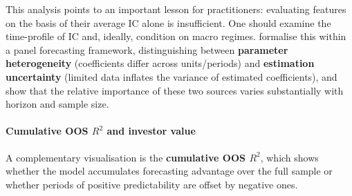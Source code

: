This analysis points to an important lesson for practitioners: evaluating features on the basis of their average IC alone is insufficient. One should examine the time-profile of IC and, ideally, condition on macro regimes. \cite{pesaran2024forecasting} formalise this within a panel forecasting framework, distinguishing between \textbf{parameter heterogeneity} (coefficients differ across units/periods) and \textbf{estimation uncertainty} (limited data inflates the variance of estimated coefficients), and show that the relative importance of these two sources varies substantially with horizon and sample size.

\paragraph{Cumulative OOS $R^2$ and investor value}

A complementary visualisation is the \textbf{cumulative OOS $R^2$}, which shows whether the model accumulates forecasting advantage over the full sample or whether periods of positive predictability are offset by negative ones.


